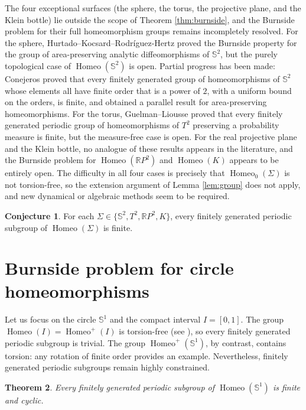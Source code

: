 \documentclass[12pt,a4paper]{amsart}
\numberwithin{equation}{section}
\DeclareMathOperator{\Homeo}{Homeo}
\theoremstyle{plain}
\newtheorem{theorem}{Theorem}
\theoremstyle{definition}
\newtheorem{conjecture}[theorem]{Conjecture}
\theoremstyle{remark}
\begin{document}
The four exceptional surfaces (the sphere, the torus, the projective plane, and the Klein bottle) lie outside the scope of Theorem \ref{thm:burnside}, and the Burnside problem for their full homeomorphism groups remains incompletely resolved.
For the sphere, Hurtado--Kocsard--Rodr\'iguez-Hertz \cite{MR4173155} proved the Burnside property for the group of area-preserving analytic diffeomorphisms of $\mathbb{S}^2$, but the purely topological case of $\Homeo(\mathbb{S}^2)$ is open.
Partial progress has been made: Conejeros \cite{MR3892240} proved that every finitely generated group of homeomorphisms of $\mathbb{S}^2$ whose elements all have finite order that is a power of $2$, with a uniform bound on the orders, is finite, and obtained a parallel result for area-preserving homeomorphisms.
For the torus, Guelman--Liousse \cite{MR3158049} proved that every finitely generated periodic group of homeomorphisms of $T^2$ preserving a probability measure is finite, but the measure-free case is open.
For the real projective plane and the Klein bottle, no analogue of these results appears in the literature, and the Burnside problem for $\Homeo(\mathbb{R}P^2)$ and $\Homeo(K)$ appears to be entirely open.
The difficulty in all four cases is precisely that $\Homeo_0(\Sigma)$ is not torsion-free, so the extension argument of Lemma \ref{lem:group} does not apply, and new dynamical or algebraic methods seem to be required.

\begin{conjecture}
    For each $\Sigma \in \{\mathbb{S}^2, T^2, \mathbb{R}P^2, K\}$, every finitely generated periodic subgroup of $\Homeo(\Sigma)$ is finite.
\end{conjecture}


\section*{Burnside problem for circle homeomorphisms}

Let us focus on the circle $\mathbb{S}^1$ and the compact interval $I = [0,1]$.
The group $\Homeo(I) = \Homeo^+(I)$ is torsion-free (see \cite{MR3560661}), so every finitely generated periodic subgroup is trivial.
The group $\Homeo^+(\mathbb{S}^1)$, by contrast, contains torsion: any rotation of finite order provides an example.
Nevertheless, finitely generated periodic subgroups remain highly constrained.

\begin{theorem} \label{thm:circle}
Every finitely generated periodic subgroup of $\Homeo(\mathbb{S}^1)$ is finite and cyclic.
\end{theorem}
\end{document}
